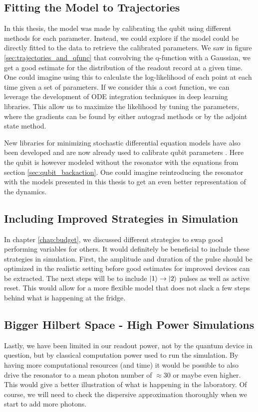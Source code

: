 \subsection{Fitting the Model to Trajectories}
In this thesis, the model was made by calibrating the qubit using different methods for each parameter. Instead, we could explore if the model could be directly fitted to the data to retrieve the calibrated parameters. We saw in figure \ref{sec:trajectories_and_qfunc} that convolving the q-function with a Gaussian, we get a good estimate for the distribution of the readout record at a given time. One could imagine using this to calculate the log-likelihood of each point at each time given a set of parameters. If we consider this a cost function, we can leverage the development of ODE integration techniques in deep learning libraries. This allow us to maximize the likelihood by tuning the parameters, where the gradients can be found by either autograd methods or by the adjoint state method. \cite{allaire_review_2015}

New libraries for minimizing stochastic differential equation models have also been developed and are now already used to calibrate qubit parameters \cite{genois_quantum-tailored_2021}. Here the qubit is however modeled without the resonator with the equations from section \ref{sec:qubit_backaction}. One could imagine reintroducing the resonator with the models presented in this thesis to get an even better representation of the dynamics.


\subsection{Including Improved Strategies in Simulation} 
In chapter \ref{chap:budget}, we discussed different strategies to swap good performing variables for others. It would definitely be beneficial to include these strategies in simulation. First, the amplitude and duration of the pulse should be optimized in the realistic setting before good estimates for improved devices can be extracted. The next steps will be to include $\ket{1}\to\ket{2}$ pulses as well as active reset. This would allow for a more flexible model that does not slack a few steps behind what is happening at the fridge. 

\subsection{Bigger Hilbert Space - High Power Simulations}
Lastly, we have been limited in our readout power, not by the quantum device in question, but by classical computation power used to run the simulation. By having more computational resources (and time) it would be possible to also drive the resonator to a mean photon number of $\approx30$ or maybe even higher. This would give a better illustration of what is happening in the laboratory. Of course, we will need to check the dispersive approximation thoroughly when we start to add more photons.   
